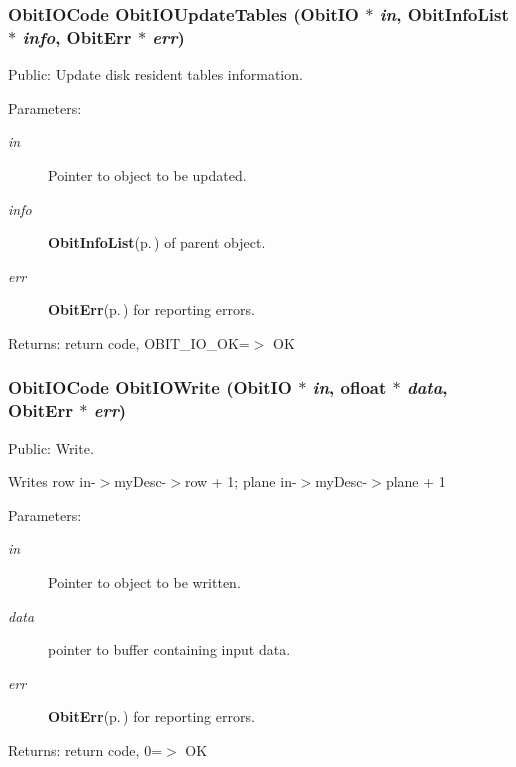 \subsubsection{\setlength{\rightskip}{0pt plus 5cm}Obit\-IOCode Obit\-IOUpdate\-Tables ({\bf Obit\-IO} $\ast$ {\em in}, {\bf Obit\-Info\-List} $\ast$ {\em info}, {\bf Obit\-Err} $\ast$ {\em err})}\label{ObitIO_8h_a54}


Public: Update disk resident tables information. 

\begin{Desc}
\item[Parameters:]
\begin{description}
\item[{\em in}]Pointer to object to be updated. \item[{\em info}]{\bf Obit\-Info\-List}{\rm (p.\,\pageref{structObitInfoList})} of parent object. \item[{\em err}]{\bf Obit\-Err}{\rm (p.\,\pageref{structObitErr})} for reporting errors. \end{description}
\end{Desc}
\begin{Desc}
\item[Returns:]return code, OBIT\_\-IO\_\-OK=$>$ OK \end{Desc}
\subsubsection{\setlength{\rightskip}{0pt plus 5cm}Obit\-IOCode Obit\-IOWrite ({\bf Obit\-IO} $\ast$ {\em in}, {\bf ofloat} $\ast$ {\em data}, {\bf Obit\-Err} $\ast$ {\em err})}\label{ObitIO_8h_a46}


Public: Write. 

Writes row in-$>$my\-Desc-$>$row + 1; plane in-$>$my\-Desc-$>$plane + 1 \begin{Desc}
\item[Parameters:]
\begin{description}
\item[{\em in}]Pointer to object to be written. \item[{\em data}]pointer to buffer containing input data. \item[{\em err}]{\bf Obit\-Err}{\rm (p.\,\pageref{structObitErr})} for reporting errors. \end{description}
\end{Desc}
\begin{Desc}
\item[Returns:]return code, 0=$>$ OK \end{Desc}
